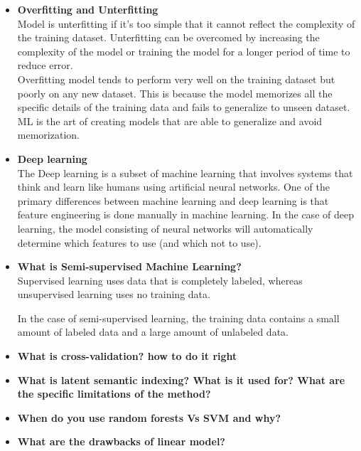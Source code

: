 \documentclass{article}
\begin{document}
\begin{itemize}
\item \textbf{Overfitting and Unterfitting}\\
Model is unterfitting if it's too simple that it cannot reflect the complexity of the training dataset. Unterfitting can be overcomed by increasing the complexity of the model or training the model for a longer period of time to reduce error.\\

Overfitting model tends to perform very well on the training dataset but poorly on any new dataset. This is because the model memorizes all the specific details of the training data and fails to generalize to unseen dataset.\\

ML is the art of creating models that are able to generalize and avoid memorization.
\item \textbf{Deep learning}\\
The Deep learning is a subset of machine learning that involves systems that think and learn like humans using artificial neural networks. One of the primary differences between machine learning and deep learning is that feature engineering is done manually in machine learning. In the case of deep learning, the model consisting of neural networks will automatically determine which features to use (and which not to use).
\item \textbf{What is Semi-supervised Machine Learning?}\\
Supervised learning uses data that is completely labeled, whereas unsupervised learning uses no training data.

In the case of semi-supervised learning, the training data contains a small amount of labeled data and a large amount of unlabeled data.

\item \textbf{What is cross-validation? how to do it right}\\

\item \textbf{What is latent semantic indexing? What is it used for? What are the specific limitations of the method?}\\

\item \textbf{When do you use random forests Vs SVM and why?}\\

\item \textbf{What are the drawbacks of linear model?}\\


\end{itemize}
\end{document}
